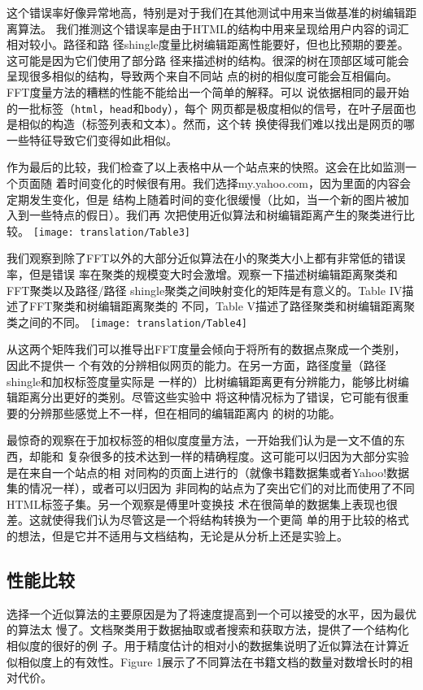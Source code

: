 这个错误率好像异常地高，特别是对于我们在其他测试中用来当做基准的树编辑距离算法。
我们推测这个错误率是由于HTML的结构中用来呈现给用户内容的词汇相对较小。路径和路
径shingle度量比树编辑距离性能要好，但也比预期的要差。这可能是因为它们使用了部分路
径来描述树的结构。很深的树在顶部区域可能会呈现很多相似的结构，导致两个来自不同站
点的树的相似度可能会互相偏向。FFT度量方法的糟糕的性能不能给出一个简单的解释。可以
说依据相同的最开始的一批标签（\texttt{html}，\texttt{head}和\texttt{body}），每个
网页都是极度相似的信号，在叶子层面也是相似的构造（标签列表和文本）。然而，这个转
换使得我们难以找出是网页的哪一些特征导致它们变得如此相似。

作为最后的比较，我们检查了以上表格中从一个站点来的快照。这会在比如监测一个页面随
着时间变化的时候很有用。我们选择my.yahoo.com，因为里面的内容会定期发生变化，但是
结构上随着时间的变化很缓慢（比如，当一个新的图片被加入到一些特点的假日）。我们再
次把使用近似算法和树编辑距离产生的聚类进行比较。{\centering
  \texttt{[image: translation/Table3]}
}

我们观察到除了FFT以外的大部分近似算法在小的聚类大小上都有非常低的错误率，但是错误
率在聚类的规模变大时会激增。观察一下描述树编辑距离聚类和FFT聚类以及路径/路径
shingle聚类之间映射变化的矩阵是有意义的。Table IV描述了FFT聚类和树编辑距离聚类的
不同，Table V描述了路径聚类和树编辑距离聚类之间的不同。
{\centering
  \texttt{[image: translation/Table4]}
}

从这两个矩阵我们可以推导出FFT度量会倾向于将所有的数据点聚成一个类别，因此不提供一
个有效的分辨相似网页的能力。在另一方面，路径度量（路径shingle和加权标签度量实际是
一样的）比树编辑距离更有分辨能力，能够比树编辑距离分出更好的类别。尽管这些实验中
将这种情况标为了错误，它可能有很重要的分辨那些感觉上不一样，但在相同的编辑距离内
的树的功能。

最惊奇的观察在于加权标签的相似度度量方法，一开始我们认为是一文不值的东西，却能和
复杂很多的技术达到一样的精确程度。这可能可以归因为大部分实验是在来自一个站点的相
对同构的页面上进行的（就像书籍数据集或者Yahoo!数据集的情况一样），或者可以归因为
非同构的站点为了突出它们的对比而使用了不同HTML标签子集。另一个观察是傅里叶变换技
术在很简单的数据集上表现也很差。这就使得我们认为尽管这是一个将结构转换为一个更简
单的用于比较的格式的想法，但是它并不适用与文档结构，无论是从分析上还是实验上。

\subsection{性能比较}
选择一个近似算法的主要原因是为了将速度提高到一个可以接受的水平，因为最优的算法太
慢了。文档聚类用于数据抽取或者搜索和获取方法，提供了一个结构化相似度的很好的例
子。用于精度估计的相对小的数据集说明了近似算法在计算近似相似度上的有效性。Figure
1展示了不同算法在书籍文档的数量对数增长时的相对代价。

